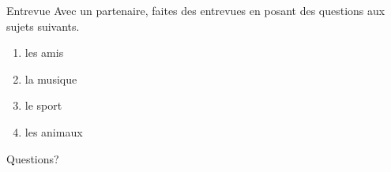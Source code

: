 \documentclass{beamer}
\begin{document}
  \begin{frame}{}
  \end{frame}

  \begin{frame}{Entrevue}
    Avec un partenaire, faites des entrevues en posant des questions aux sujets suivants.  \\
    \begin{enumerate}
      \item les amis
      \item la musique
      \item le sport
      \item les animaux
    \end{enumerate}
  \end{frame}

  \begin{frame}{}
    \begin{center}
      \Large Questions?
    \end{center}
  \end{frame}
\end{document}
